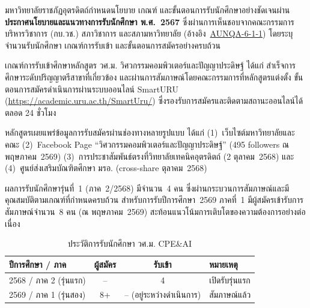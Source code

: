 


มหาวิทยาลัยราชภัฏอุตรดิตถ์กำหนดนโยบาย เกณฑ์ และขั้นตอนการรับนักศึกษาอย่างชัดเจนผ่าน \textbf{ประกาศนโยบายและแนวทางการรับนักศึกษา พ.ศ.~2567} ซึ่งผ่านการเห็นชอบจากคณะกรรมการบริหารวิชาการ (กบ.วช.) สภาวิชาการ และสภามหาวิทยาลัย (อ้างอิง~\hyperlink{ref:AUNQA-6-1-1}{AUNQA-6-1-1}) โดยระบุจำนวนรับนักศึกษา เกณฑ์การรับเข้า และขั้นตอนการสมัครอย่างครบถ้วน

เกณฑ์การรับเข้าศึกษาหลักสูตร วศ.ม. วิศวกรรมคอมพิวเตอร์และปัญญาประดิษฐ์ ได้แก่ สำเร็จการศึกษาระดับปริญญาตรีสาขาที่เกี่ยวข้อง และผ่านการสัมภาษณ์โดยคณะกรรมการที่หลักสูตรแต่งตั้ง ขั้นตอนการสมัครดำเนินการผ่านระบบออนไลน์ SmartURU (\url{https://academic.uru.ac.th/SmartUru/}) ซึ่งรองรับการสมัครและติดตามสถานะออนไลน์ได้ตลอด 24 ชั่วโมง

หลักสูตรเผยแพร่ข้อมูลการรับสมัครผ่านช่องทางหลายรูปแบบ ได้แก่ (1)~เว็บไซต์มหาวิทยาลัยและคณะ (2)~Facebook Page ``วิศวกรรมคอมพิวเตอร์และปัญญาประดิษฐ์'' (495 followers ณ พฤษภาคม~2569) (3)~การประชาสัมพันธ์ตรงที่วิทยาลัยเทคนิคอุตรดิตถ์ (2 ตุลาคม~2568) และ (4)~ศูนย์ส่งเสริมบัณฑิตศึกษา มรอ. (cross-share ตุลาคม~2568)

ผลการรับนักศึกษารุ่นที่~1 (ภาค~2/2568) มีจำนวน~4 คน ซึ่งผ่านกระบวนการสัมภาษณ์และมีคุณสมบัติตามเกณฑ์ที่กำหนดครบถ้วน สำหรับการรับปีการศึกษา~2569 ภาคที่~1 มีผู้สมัครเข้ารับการสัมภาษณ์จำนวน~8 คน (ณ พฤษภาคม~2569) สะท้อนแนวโน้มการเติบโตของความต้องการอย่างต่อเนื่อง

\begin{table}[H]
  \centering
  \caption{ประวัติการรับนักศึกษา วศ.ม. CPE\&AI}
  \label{tbl:intake_history}
  \begingroup
  \footnotesize
  \setlength{\tabcolsep}{4pt}
  \renewcommand{\arraystretch}{1.2}
  \begin{tabularx}{\linewidth}{|l|c|c|l|}
    \hline
    \textbf{ปีการศึกษา / ภาค} & \textbf{ผู้สมัคร} & \textbf{รับเข้า} & \textbf{หมายเหตุ} \\
    \hline
    2568 / ภาค 2 (รุ่นแรก) & -- & 4 & เปิดรับรุ่นแรก \\
    \hline
    2569 / ภาค 1 (รุ่นสอง) & 8+ & -- (อยู่ระหว่างดำเนินการ) & สัมภาษณ์แล้ว \\
    \hline
  \end{tabularx}
  \endgroup
\end{table}

